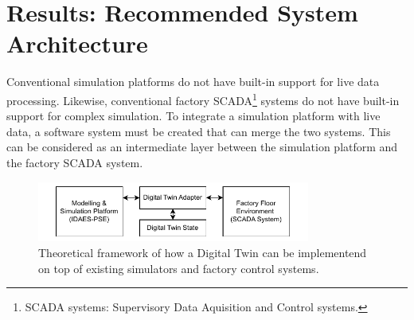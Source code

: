 \chapter{Results: Recommended System Architecture} \label{sec:proposed_architecture}







Conventional simulation platforms do not have built-in support for live data processing. Likewise, conventional factory SCADA\footnote{SCADA systems: Supervisory Data Aquisition and Control systems.} systems do not have built-in support for complex simulation. To integrate a simulation platform with live data, a software system must be created that can merge the two systems. This can be considered as an intermediate layer between the simulation platform and the factory SCADA system.


\begin{figure}[h]
    \centering
    \includegraphics[width=0.8\textwidth]{research_article/research_journal_framework_simple.pdf}
    \caption{Theoretical framework of how a Digital Twin can be implementend on top of existing simulators and factory control systems.}
    \label{fig:theoretical_framework}
\end{figure}

